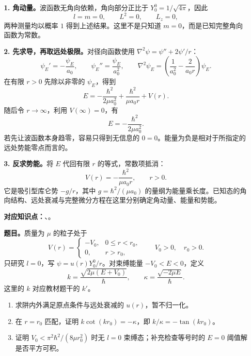 \begin{checkedsolution}
\textbf{1. 角动量。}波函数无角向依赖，角向部分正比于 $Y_0^0=1/\sqrt{4\pi}$，因此
\begin{equation}
  \boxed{l=m=0,\qquad L^2=0,\qquad L_z=0,}
\end{equation}
两种测量均以概率 $1$ 得到上述结果。这里不是只知道 $m=0$，而是已知完整角向函数为常数。

\textbf{2. 先求导，再取远处极限。}对径向函数使用 $\nabla^2\psi=\psi''+2\psi'/r$：
\begin{equation}
  \psi_E'=-\frac{\psi_E}{a_0},\qquad
  \psi_E''=\frac{\psi_E}{a_0^2},\qquad
  \nabla^2\psi_E=\left(\frac1{a_0^2}-\frac2{a_0r}\right)\psi_E.
\end{equation}
在有限 $r>0$ 先除以非零的 $\psi_E$，得到
\begin{equation}
  E=-\frac{\hbar^2}{2\mu a_0^2}+\frac{\hbar^2}{\mu a_0r}+V(r).
\end{equation}
随后令 $r\to\infty$，利用 $V(\infty)=0$，有
\begin{equation}
  \boxed{E=-\frac{\hbar^2}{2\mu a_0^2}.}
\end{equation}
若先让波函数本身趋零，容易只得到无信息的 $0=0$。能量为负是相对于所指定的远处势能零点而言的。

\textbf{3. 反求势能。}将 $E$ 代回有限 $r$ 的等式，常数项抵消：
\begin{equation}
  \boxed{V(r)=-\frac{\hbar^2}{\mu a_0r},\qquad r>0.}
\end{equation}
它是吸引型库仑势 $-g/r$，其中 $g=\hbar^2/(\mu a_0)$ 的量纲为能量乘长度。已知态的角向结构、远处衰减与完整微分方程在这里分别确定角动量、能量和势能。
\end{checkedsolution}

\textbf{对应知识点：}、。

\textbf{题目。}质量为 $\mu$ 的粒子处于
\begin{equation}
  V(r)=\begin{cases}-V_0,&0\leq r<r_0,\\0,&r>r_0,\end{cases}
  \qquad V_0>0,\quad r_0>0.
\end{equation}
只研究 $l=0$，写 $\psi=u(r)Y_0^0/r$。对束缚能量 $-V_0<E<0$，定义
\begin{equation}
  k=\frac{\sqrt{2\mu(E+V_0)}}\hbar,\qquad
  \kappa=\frac{\sqrt{-2\mu E}}\hbar.
\end{equation}
这里的 $k$ 对应教材题干的 $k'$。
\begin{enumerate}
  \item 求阱内外满足原点条件与远处衰减的 $u(r)$，暂不归一化。
  \item 在 $r=r_0$ 匹配，证明 $k\cot(kr_0)=-\kappa$，即 $k/\kappa=-\tan(kr_0)$。
  \item 证明 $V_0<\pi^2\hbar^2/(8\mu r_0^2)$ 时无 $l=0$ 束缚态；补充检查等号时的 $E=0$ 阈值解是否平方可积。
\end{enumerate}

